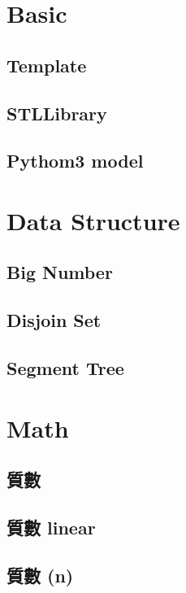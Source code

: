 \section{Basic}
\subsection{Template}

\subsection{STLLibrary}

\subsection{Pythom3 model}


\section{Data Structure}
\subsection{Big Number}

\subsection{Disjoin Set}

\subsection{Segment Tree}


\section{Math}
\subsection{質數}

\subsection{質數 linear}

\subsection{質數 (n)}

